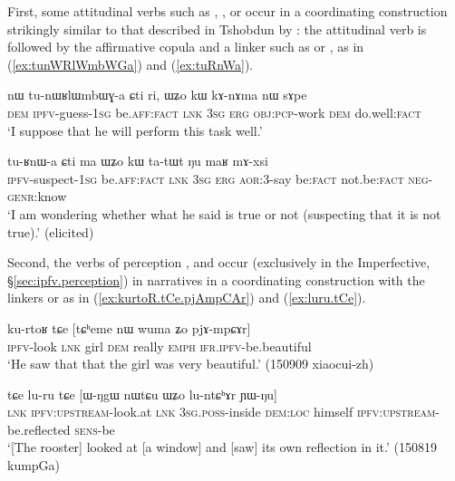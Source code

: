 First, some attitudinal verbs such as , ,  or  occur in a coordinating construction strikingly similar to that described in Tshobdun  by \citet[487--488]{sun12complementation}: the attitudinal verb is followed by the affirmative copula  and a linker such as  or , as in (\ref{ex:tunWRlWmbWGa}) and (\ref{ex:tuRnWa}).

\begin{exe}
	\ex \label{ex:tunWRlWmbWGa}
	\gll nɯ tu-nɯʁlɯmbɯɣ-a ɕti ri, ɯʑo kɯ kɤ-nɤma nɯ sɤpe \\
	\textsc{dem} \textsc{ipfv}-guess-\textsc{1sg} be.\textsc{aff}:\textsc{fact} \textsc{lnk} \textsc{3sg} \textsc{erg} \textsc{obj}:\textsc{pcp}-work \textsc{dem} do.well:\textsc{fact} \\
	\glt `I suppose that he will perform this task well.'
\end{exe}

\begin{exe}
	\ex \label{ex:tuRnWa}
	\gll tu-ʁnɯ-a ɕti ma ɯʑo kɯ ta-tɯt ŋu maʁ mɤ-xsi \\
	\textsc{ipfv}-suspect-\textsc{1sg} be.\textsc{aff}:\textsc{fact} \textsc{lnk} \textsc{3sg} \textsc{erg} \textsc{aor}:3\flobv{}-say be:\textsc{fact} not.be:\textsc{fact} \textsc{neg}-\textsc{genr}:know \\
	\glt `I am wondering whether what he said is true or not (suspecting that it is not true).' (elicited)
\end{exe}

Second, the verbs of perception  ,   and  occur (exclusively in the Imperfective, §\ref{sec:ipfv.perception}) in narratives in a coordinating construction with the linkers  or  as in (\ref{ex:kurtoR.tCe.pjAmpCAr}) and (\ref{ex:luru.tCe}). 

\begin{exe}
	\ex \label{ex:kurtoR.tCe.pjAmpCAr}
	\gll  ku-rtoʁ tɕe [tɕʰeme nɯ wuma ʑo pjɤ-mpɕɤr] \\
	\textsc{ipfv}-look \textsc{lnk} girl \textsc{dem} really \textsc{emph} \textsc{ifr}.\textsc{ipfv}-be.beautiful \\
	\glt `He saw that that the girl was very beautiful.' (150909 xiaocui-zh)
\end{exe}

\begin{exe}
	\ex \label{ex:luru.tCe}
	\gll tɕe lu-ru tɕe [ɯ-ŋgɯ nɯtɕu ɯʑo lu-ntɕʰɤr ɲɯ-ŋu] \\
	\textsc{lnk} \textsc{ipfv}:\textsc{upstream}-look.at  \textsc{lnk}  \textsc{3sg}.\textsc{poss}-inside \textsc{dem}:\textsc{loc} himself \textsc{ipfv}:\textsc{upstream}-be.reflected \textsc{sens}-be \\
	\glt `[The rooster] looked at [a window] and [saw] its own reflection in it.' (150819 kumpGa)
\end{exe}

